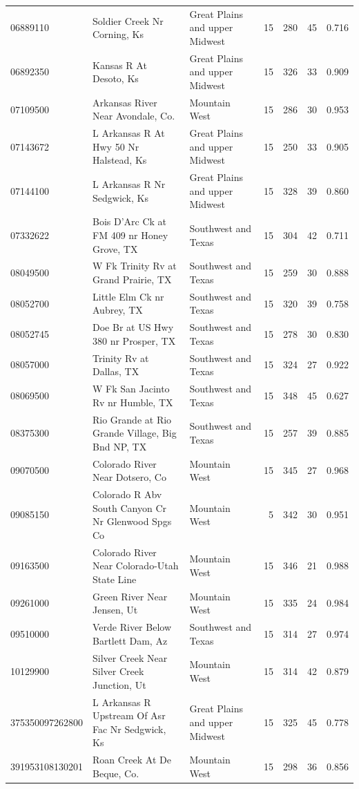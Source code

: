 \documentclass[11pt]{article}
\begin{document}
\begin{longtable}{@{}lp{4.6cm}p{3.0cm}rrrr@{}}
06889110 & Soldier Creek Nr Corning, Ks & Great Plains and upper Midwest & 15 & 280 & 45 & 0.716 \\
06892350 & Kansas R At Desoto, Ks & Great Plains and upper Midwest & 15 & 326 & 33 & 0.909 \\
07109500 & Arkansas River Near Avondale, Co. & Mountain West & 15 & 286 & 30 & 0.953 \\
07143672 & L Arkansas R At Hwy 50 Nr Halstead, Ks & Great Plains and upper Midwest & 15 & 250 & 33 & 0.905 \\
07144100 & L Arkansas R Nr Sedgwick, Ks & Great Plains and upper Midwest & 15 & 328 & 39 & 0.860 \\
07332622 & Bois D'Arc Ck at FM 409 nr Honey Grove, TX & Southwest and Texas & 15 & 304 & 42 & 0.711 \\
08049500 & W Fk Trinity Rv at Grand Prairie, TX & Southwest and Texas & 15 & 259 & 30 & 0.888 \\
08052700 & Little Elm Ck nr Aubrey, TX & Southwest and Texas & 15 & 320 & 39 & 0.758 \\
08052745 & Doe Br at US Hwy 380 nr Prosper, TX & Southwest and Texas & 15 & 278 & 30 & 0.830 \\
08057000 & Trinity Rv at Dallas, TX & Southwest and Texas & 15 & 324 & 27 & 0.922 \\
08069500 & W Fk San Jacinto Rv nr Humble, TX & Southwest and Texas & 15 & 348 & 45 & 0.627 \\
08375300 & Rio Grande at Rio Grande Village, Big Bnd NP, TX & Southwest and Texas & 15 & 257 & 39 & 0.885 \\
09070500 & Colorado River Near Dotsero, Co & Mountain West & 15 & 345 & 27 & 0.968 \\
09085150 & Colorado R Abv South Canyon Cr Nr Glenwood Spgs Co & Mountain West & 5 & 342 & 30 & 0.951 \\
09163500 & Colorado River Near Colorado-Utah State Line & Mountain West & 15 & 346 & 21 & 0.988 \\
09261000 & Green River Near Jensen, Ut & Mountain West & 15 & 335 & 24 & 0.984 \\
09510000 & Verde River Below Bartlett Dam, Az & Southwest and Texas & 15 & 314 & 27 & 0.974 \\
10129900 & Silver Creek Near Silver Creek Junction, Ut & Mountain West & 15 & 314 & 42 & 0.879 \\
375350097262800 & L Arkansas R Upstream Of Asr Fac Nr Sedgwick, Ks & Great Plains and upper Midwest & 15 & 325 & 45 & 0.778 \\
391953108130201 & Roan Creek At De Beque, Co. & Mountain West & 15 & 298 & 36 & 0.856 \\
\bottomrule
\end{longtable}
\end{document}
